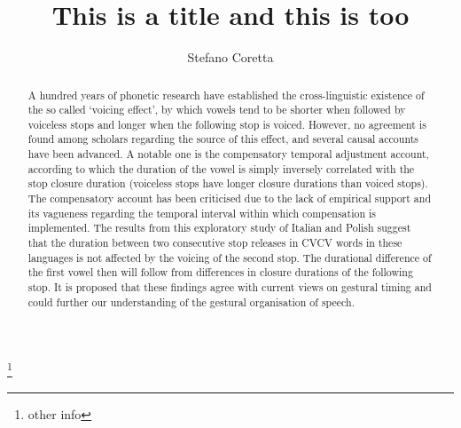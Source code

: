 \documentclass[preprint]{JASAnew}
\begin{document}

\title[A subtitle goes on another line]{This is a title and this is too}



\author{Stefano Coretta}
\thanks{other info}





\begin{abstract}
A hundred years of phonetic research have established the
cross-linguistic existence of the so called `voicing effect', by which
vowels tend to be shorter when followed by voiceless stops and longer
when the following stop is voiced. However, no agreement is found among
scholars regarding the source of this effect, and several causal
accounts have been advanced. A notable one is the compensatory temporal
adjustment account, according to which the duration of the vowel is
simply inversely correlated with the stop closure duration (voiceless
stops have longer closure durations than voiced stops). The compensatory
account has been criticised due to the lack of empirical support and its
vagueness regarding the temporal interval within which compensation is
implemented. The results from this exploratory study of Italian and
Polish suggest that the duration between two consecutive stop releases
in CVCV words in these languages is not affected by the voicing of the
second stop. The durational difference of the first vowel then will
follow from differences in closure durations of the following stop. It
is proposed that these findings agree with current views on gestural
timing and could further our understanding of the gestural organisation
of speech.
\end{abstract}
\end{document}
